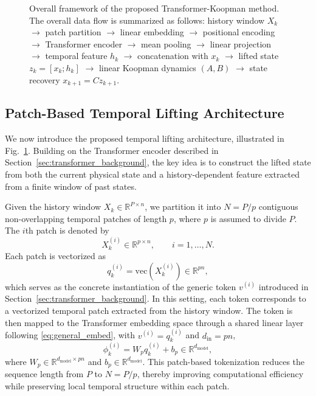 \documentclass[journal]{IEEEtran}
\begin{document}
\begin{figure}[!t]
    \centering
    \caption{Overall framework of the proposed Transformer-Koopman method. The overall data flow is summarized as follows: history window $X_k$ $\rightarrow$ patch partition $\rightarrow$ linear embedding $\rightarrow$ positional encoding $\rightarrow$ Transformer encoder $\rightarrow$ mean pooling $\rightarrow$ linear projection $\rightarrow$ temporal feature $h_k$ $\rightarrow$ concatenation with $x_k$ $\rightarrow$ lifted state $z_k=[x_k;h_k]$ $\rightarrow$ linear Koopman dynamics $(A,B)$ $\rightarrow$ state recovery $x_{k+1}=Cz_{k+1}$.}
    \label{fig:framework}
\end{figure}

\subsection{Patch-Based Temporal Lifting Architecture}
\label{sec:temporal_lifting}

We now introduce the proposed temporal lifting architecture, illustrated in Fig.~\ref{fig:framework}. Building on the Transformer encoder described in Section~\ref{sec:transformer_background}, the key idea is to construct the lifted state from both the current physical state and a history-dependent feature extracted from a finite window of past states.

Given the history window $X_k \in \mathbb{R}^{P \times n}$, we partition it into $N = P/p$ contiguous non-overlapping temporal patches of length $p$, where $p$ is assumed to divide $P$. The $i$th patch is denoted by
\begin{equation}
    X_k^{(i)} \in \mathbb{R}^{p \times n}, \qquad i=1,\ldots,N.
\end{equation}
Each patch is vectorized as
\begin{equation}
    q_k^{(i)} = \mathrm{vec}(X_k^{(i)}) \in \mathbb{R}^{pn},
    \label{eq:patch_vec}
\end{equation}
which serves as the concrete instantiation of the generic token $v^{(i)}$ introduced in Section~\ref{sec:transformer_background}. In this setting, each token corresponds to a vectorized temporal patch extracted from the history window. The token is then mapped to the Transformer embedding space through a shared linear layer following \eqref{eq:general_embed}, with $v^{(i)} = q_k^{(i)}$ and $d_{\mathrm{in}} = pn$,
\begin{equation}
    \phi_k^{(i)} = W_p q_k^{(i)} + b_p \in \mathbb{R}^{d_{\mathrm{model}}},
    \label{eq:patch_embedding}
\end{equation}
where $W_p \in \mathbb{R}^{d_{\mathrm{model}} \times pn}$ and $b_p \in \mathbb{R}^{d_{\mathrm{model}}}$. This patch-based tokenization reduces the sequence length from $P$ to $N=P/p$, thereby improving computational efficiency while preserving local temporal structure within each patch.
\end{document}
